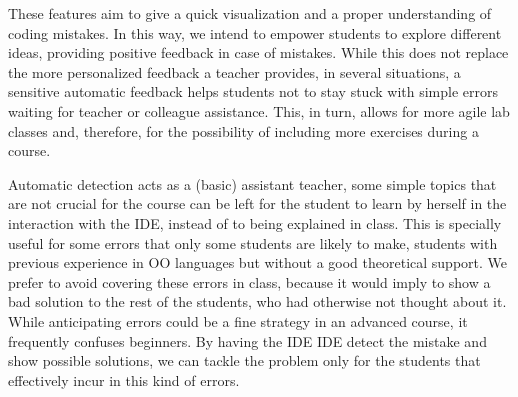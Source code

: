 These features aim to give a quick visualization and a proper understanding of coding mistakes. In this way, we intend to empower students to explore different ideas, providing positive feedback in case of mistakes.
While this does not replace the more personalized feedback a teacher provides, in several situations, a sensitive automatic feedback helps students not to stay stuck with simple errors waiting for teacher or colleague assistance.
This, in turn, allows for more agile lab classes and, therefore, for the possibility of including more exercises during a course.

\medskip
Automatic detection acts as a (basic) assistant teacher, 
\ie some simple topics that are not crucial for the course can be left for the student to learn by herself in the interaction with the IDE, 
instead of to being explained in class.
This is specially useful for some errors that only some students are likely to make,
\eg students with previous experience in OO languages but without a good theoretical support.
We prefer to avoid covering these errors in class, because it would imply to show a bad solution to the rest of the students, who had otherwise not thought about it. 
While anticipating errors could be a fine strategy in an advanced course, it frequently confuses beginners.
By having the IDE IDE detect the mistake and show possible solutions,
we can tackle the problem only for the students that effectively incur in this kind of errors.

